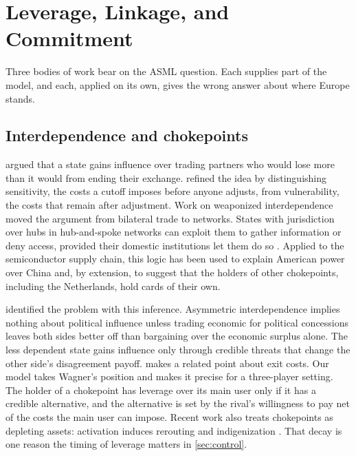 \section{Leverage, Linkage, and Commitment}\label{sec:literature}

Three bodies of work bear on the ASML question. Each supplies part of the model, and each, applied on its own, gives the wrong answer about where Europe stands.

\subsection{Interdependence and chokepoints}

\citet{hirschman1945national} argued that a state gains influence over trading partners who would lose more than it would from ending their exchange. \citet{keohane1977power} refined the idea by distinguishing sensitivity, the costs a cutoff imposes before anyone adjusts, from vulnerability, the costs that remain after adjustment. Work on weaponized interdependence moved the argument from bilateral trade to networks. States with jurisdiction over hubs in hub-and-spoke networks can exploit them to gather information or deny access, provided their domestic institutions let them do so \citep{farrell2019weaponized, farrell2023underground, drezner2021uses}. Applied to the semiconductor supply chain, this logic has been used to explain American power over China \citep{malkin2024geoeconomics, beaumier2024cross} and, by extension, to suggest that the holders of other chokepoints, including the Netherlands, hold cards of their own.

\citet{wagner1988economic} identified the problem with this inference. Asymmetric interdependence implies nothing about political influence unless trading economic for political concessions leaves both sides better off than bargaining over the economic surplus alone. The less dependent state gains influence only through credible threats that change the other side's disagreement payoff. \citet{crescenzi2003economic} makes a related point about exit costs. Our model takes Wagner's position and makes it precise for a three-player setting. The holder of a chokepoint has leverage over its main user only if it has a credible alternative, and the alternative is set by the rival's willingness to pay net of the costs the main user can impose. Recent work also treats chokepoints as depleting assets: activation induces rerouting and indigenization \citep{tan2025driven, rajan2026eroding}. That decay is one reason the timing of leverage matters in \cref{sec:control}.

